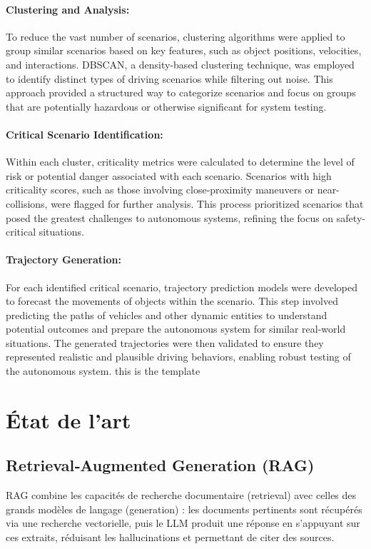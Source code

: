 \documentclass[12pt,a4paper]{report}
\begin{document}
\subsubsection*{Clustering and Analysis:}

To reduce the vast number of scenarios, clustering algorithms were applied to group similar scenarios based on key features, such as object positions, velocities, and interactions. DBSCAN, a density-based clustering technique, was employed to identify distinct types of driving scenarios while filtering out noise. This approach provided a structured way to categorize scenarios and focus on groups that are potentially hazardous or otherwise significant for system testing. 

\subsubsection*{Critical Scenario Identification:}

Within each cluster, criticality metrics were calculated to determine the level of risk or potential danger associated with each scenario. Scenarios with high criticality scores, such as those involving close-proximity maneuvers or near-collisions, were flagged for further analysis. This process prioritized scenarios that posed the greatest challenges to autonomous systems, refining the focus on safety-critical situations.
    
\subsubsection*{Trajectory Generation:}

For each identified critical scenario, trajectory prediction models were developed to forecast the movements of objects within the scenario. This step involved predicting the paths of vehicles and other dynamic entities to understand potential outcomes and prepare the autonomous system for similar real-world situations. The generated trajectories were then validated to ensure they represented realistic and plausible driving behaviors, enabling robust testing of the autonomous system.
 this is  the template

\chapter{État de l'art}
\section{Retrieval‑Augmented Generation (RAG)}
RAG combine les capacités de recherche documentaire (retrieval) avec celles des grands modèles de langage (generation) : les documents pertinents sont récupérés via une recherche vectorielle, puis le LLM produit une réponse en s'appuyant sur ces extraits, réduisant les hallucinations et permettant de citer des sources.
\end{document}
